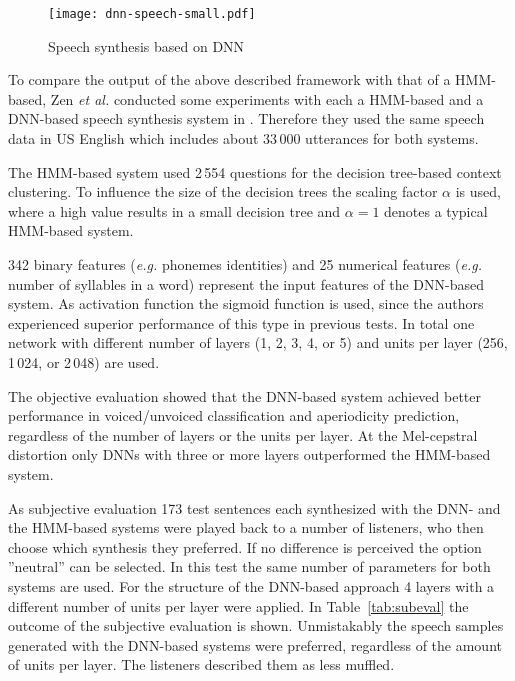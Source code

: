 \begin{figure}[h]
	\texttt{[image: dnn-speech-small.pdf]}
	\caption{Speech synthesis based on \ac{DNN} \cite{zen:deepstatistical}}
	\label{fig:dnnspeech}
\end{figure}

To compare the output of the above described framework with that of a \ac{HMM}-based, Zen \textit{et al.} conducted some experiments with each a \ac{HMM}-based and a \ac{DNN}-based speech synthesis system in \cite{zen:deepstatistical}. Therefore they used the same speech data in US English which includes about 33\,000 utterances for both systems. 

The \ac{HMM}-based system used 2\,554 questions for the decision tree-based context clustering. To influence the size of the decision trees the scaling factor $\alpha$ is used, where a high value results in a small decision tree and $\alpha = 1$ denotes a typical \ac{HMM}-based system.

342 binary features (\textit{e.g.} phonemes identities) and 25 numerical features (\textit{e.g.} number of syllables in a word) represent the input features of the \ac{DNN}-based system. As activation function the sigmoid function is used, since the authors experienced superior performance of this type in previous tests. In total one network with different number of layers (1, 2, 3, 4, or 5) and units per layer (256, 1\,024, or 2\,048) are used.

The objective evaluation showed that the \ac{DNN}-based system achieved better performance in voiced/unvoiced classification and aperiodicity prediction, regardless of the number of layers or the units per layer. At the Mel-cepstral distortion only \acp{DNN} with three or more layers outperformed the \ac{HMM}-based system. 

As subjective evaluation 173 test sentences each synthesized with the \ac{DNN}- and the \ac{HMM}-based systems were played back to a number of listeners, who then choose which synthesis they preferred. If no difference is perceived the option ''neutral'' can be selected. In this test the same number of parameters for both systems are used. For the structure of the \ac{DNN}-based approach 4 layers with a different number of units per layer were applied. In Table~\ref{tab:subeval} the outcome of the subjective evaluation is shown. Unmistakably the speech samples generated with the \ac{DNN}-based systems were preferred, regardless of the amount of units per layer. The listeners described them as less muffled.

